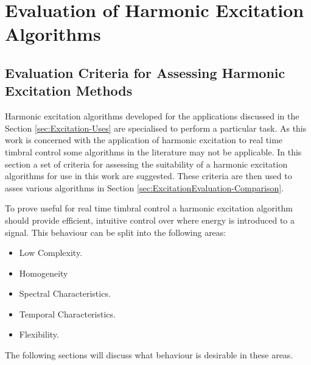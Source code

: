 
\chapter{Evaluation of Harmonic Excitation Algorithms}
\label{chap:ExcitationEvaluation}

\section{Evaluation Criteria for Assessing Harmonic Excitation Methods} %
\label{sec:ExcitationEvaluation-Evaluation}
	Harmonic excitation algorithms developed for the applications discussed in the Section
	\ref{sec:Excitation-Uses} are specialised to perform a particular task. As this work is concerned with
	the application of harmonic excitation to real time timbral control some algorithms in the literature may
	not be applicable. In this section a set of criteria for assessing the suitability of a harmonic excitation
	algorithms for use in this work are suggested.  These criteria are then used to asses various algorithms in Section
	\ref{sec:ExcitationEvaluation-Comparison}. 

	To prove useful for real time timbral control a harmonic excitation algorithm should provide efficient, intuitive
	control over where energy is introduced to a signal. This behaviour can be split into the following areas:

	\begin{itemize}
		\item Low Complexity.
		\item Homogeneity
		\item Spectral Characteristics.
		\item Temporal Characteristics.
		\item Flexibility.
	\end{itemize}

	The following sections will discuss what behaviour is desirable in these areas.

